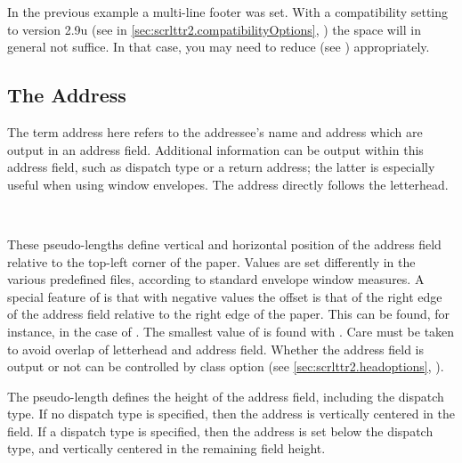 In the previous example a multi-line footer was set.  With a
compatibility setting to version 2.9u (see  in
\autoref{sec:scrlttr2.compatibilityOptions},
) the space will in general
not suffice. In that case, you may need to reduce
 (see
) appropriately.
% 
%
%
%

\subsection{The Address}
\label{sec:scrlttr2.addressee}
%

The term address here refers to the addressee's name and address which
are output in an address field. Additional information can be output
within this address field, such as dispatch type or a return address;
the latter is especially useful when using window envelopes. The
address directly follows the letterhead.

\begin{Declaration}
  \\
\end{Declaration}
%
%
These pseudo-lengths define vertical and horizontal position of the
address field relative to the top-left corner of the paper. Values are
set differently in the various predefined  files, according
to standard envelope window measures. A special feature of
 is that with negative values the offset is that
of the right edge of the address field relative to the right edge of
the paper. This can be found, for instance, in the case of
. The smallest value of  is found with
. Care must be taken to avoid overlap of letterhead
and address field. Whether the address field is output or not can be
controlled by class option  (see
\autoref{sec:scrlttr2.headoptions},
).
%
%
%

\begin{Declaration}
\end{Declaration}
%
The pseudo-length  defines the height of the
address field, including the dispatch type. If no dispatch type is
specified, then the address is vertically centered in the field. If a
dispatch type is specified, then the address is set below the dispatch
type, and vertically centered in the remaining field height.
%
%
 
